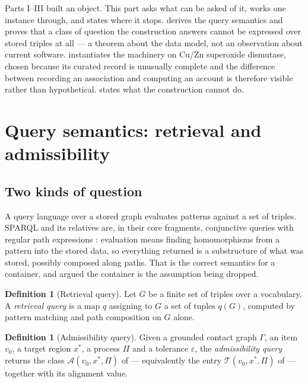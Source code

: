 \documentclass[11pt,twocolumn,a4paper]{article}
\theoremstyle{thmstyle}
\theoremstyle{definition}
\newtheorem{definition}[theorem]{Definition}
\theoremstyle{remark}
\newcommand{\Gph}{\Gamma}
\newcommand{\acc}{\mathcal{A}}
\newcommand{\Proc}{\Pi}
\newcommand{\Tab}{\mathcal{T}}
\newcommand{\eps}{\varepsilon}
\begin{document}
\noindent
Parts I--III built an object. This part asks what can be asked of it,
works one instance through, and states where it stops.
 derives the query semantics and proves that a class
of question the construction answers cannot be expressed over stored
triples at all --- a theorem about the data model, not an observation
about current software.  instantiates the machinery on
Cu/Zn superoxide dismutase, chosen because its curated record is
unusually complete and the difference between recording an association
and computing an account is therefore visible rather than
hypothetical.  states what the construction cannot do.

\section{Query semantics: retrieval and admissibility}
\label{sec:queries}

\subsection{Two kinds of question}

A query language over a stored graph evaluates patterns against a set
of triples. SPARQL and its relatives are, in their core fragments,
conjunctive queries with regular path expressions
\citep{perez2009,barcelo2013,angles2017}: evaluation means finding
homomorphisms from a pattern into the stored data, so everything
returned is a substructure of what was stored, possibly composed along
paths. That is the correct semantics for a container, and
 argued the container is the assumption being
dropped.

\begin{definition}[Retrieval query]
\label{def:retrieval}
Let $G$ be a finite set of triples over a vocabulary. A
\emph{retrieval query} is a map $q$ assigning to $G$ a set of tuples
$q(G)$, computed by pattern matching and path composition on $G$
alone.
\end{definition}

\begin{definition}[Admissibility query]
\label{def:admissibility}
Given a grounded contact graph $\Gph$, an item $v_0$, a target region
$x^{*}$, a process $\Proc$ and a tolerance $\eps$, the
\emph{admissibility query} returns the class
$\acc(v_0, x^{*}, \Proc)$ of  --- equivalently
the entry $\Tab(v_0,x^{*},\Proc)$ of  --- together
with its alignment value.
\end{definition}
\end{document}
